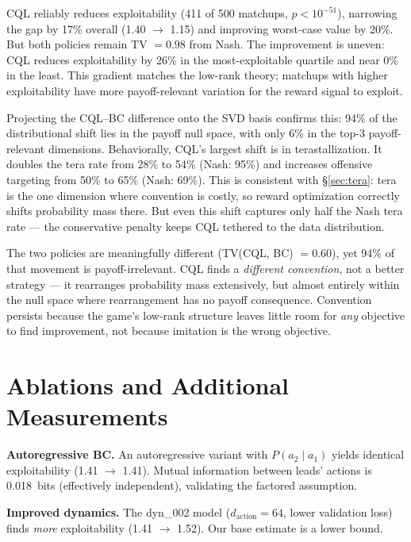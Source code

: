 \documentclass{article}
\begin{document}
CQL reliably reduces exploitability (411 of 500 matchups, $p < 10^{-51}$), narrowing the gap by 17\% overall (1.40 $\to$ 1.15) and improving worst-case value by 20\%. But both policies remain TV $= 0.98$ from Nash. The improvement is uneven: CQL reduces exploitability by 26\% in the most-exploitable quartile and near 0\% in the least. This gradient matches the low-rank theory; matchups with higher exploitability have more payoff-relevant variation for the reward signal to exploit.

Projecting the CQL--BC difference onto the SVD basis confirms this: 94\% of the distributional shift lies in the payoff null space, with only 6\% in the top-3 payoff-relevant dimensions. Behaviorally, CQL's largest shift is in terastallization. It doubles the tera rate from 28\% to 54\% (Nash: 95\%) and increases offensive targeting from 50\% to 65\% (Nash: 69\%). This is consistent with \S\ref{sec:tera}: tera is the one dimension where convention is costly, so reward optimization correctly shifts probability mass there. But even this shift captures only half the Nash tera rate --- the conservative penalty keeps CQL tethered to the data distribution.

The two policies are meaningfully different (TV(CQL, BC) $= 0.60$), yet 94\% of that movement is payoff-irrelevant. CQL finds a \emph{different convention}, not a better strategy --- it rearranges probability mass extensively, but almost entirely within the null space where rearrangement has no payoff consequence. Convention persists because the game's low-rank structure leaves little room for \emph{any} objective to find improvement, not because imitation is the wrong objective.

\section{Ablations and Additional Measurements}
\label{sec:ablations}

\textbf{Autoregressive BC.} An autoregressive variant with $P(a_2 \mid a_1)$ yields identical exploitability (1.41 $\to$ 1.41). Mutual information between leads' actions is 0.018~bits (effectively independent), validating the factored assumption.

\textbf{Improved dynamics.} The dyn\_002 model ($d_\text{action} = 64$, lower validation loss) finds \emph{more} exploitability (1.41 $\to$ 1.52). Our base estimate is a lower bound.
\end{document}
